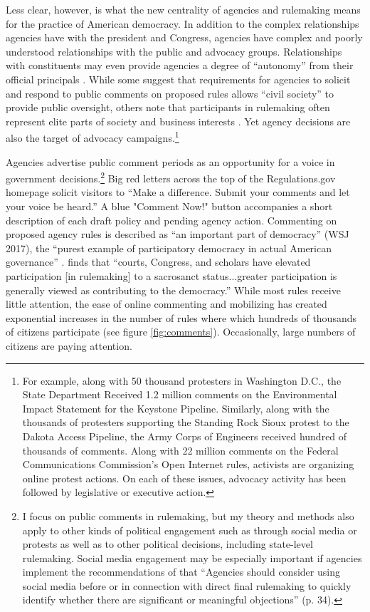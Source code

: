 Less clear, however, is what the new centrality of agencies and rulemaking means for the practice of American democracy. In addition to the complex relationships agencies have with the president and Congress, agencies have complex and poorly understood relationships with the public and advocacy groups. Relationships with constituents may even provide agencies a degree of ``autonomy'' from their official principals \citep{Carpenter2001}. While some suggest that requirements for agencies to solicit and respond to public comments on proposed rules allows ``civil society'' to provide public oversight, others note that participants in rulemaking often represent elite parts of society \citep{Seifter2016ComplementaryPower} and business interests \citep{Yackee2006a}. Yet agency decisions are also the target of advocacy campaigns.\footnote{For example, along with 50 thousand protesters in Washington D.C., the State Department Received 1.2 million comments on the Environmental Impact Statement for the Keystone Pipeline. Similarly, along with the thousands of protesters supporting the Standing Rock Sioux protest to the Dakota Access Pipeline, the Army Corps of Engineers received hundred of thousands of comments. Along with 22 million comments on the Federal Communications Commission's Open Internet rules, activists are organizing online protest actions. On each of these issues, advocacy activity has been followed by legislative or executive action.} 

Agencies advertise public comment periods as an opportunity for a voice in government decisions.\footnote{
I focus on public comments in rulemaking, but my theory and methods also apply to other kinds of political engagement such as through social media or protests as well as to other political decisions, including state-level rulemaking. Social media engagement may be especially important if agencies implement the recommendations of \citet{ACUS2018} that ``Agencies should consider using social media before or in connection with direct final rulemaking to quickly identify whether there are significant or meaningful objections'' (p. 34). 
} 
Big red letters across the top of the Regulations.gov homepage solicit visitors to ``Make a difference. Submit your comments and let your voice be heard.'' A blue "Comment Now!" button accompanies a short description of each draft policy and pending agency action. 
Commenting on proposed agency rules is described as ``an important part of democracy'' (WSJ 2017), the ``purest example of participatory democracy in actual American governance'' \citep{Herz2016}. \citet{Rossi1997} finds that ``courts, Congress, and scholars have elevated participation [in rulemaking] to a sacrosanct status...greater participation is generally viewed as contributing to the democracy.'' %
 While most rules receive little attention, the ease of online commenting and mobilizing has created exponential increases in the number of rules where which hundreds of thousands of citizens participate (see figure \ref{fig:comments}). Occasionally, large numbers of citizens are paying attention.

